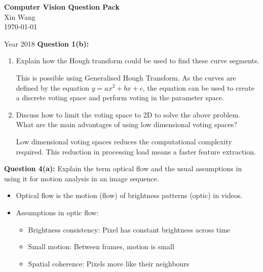 \documentclass{article}
\newcommand{\maketitletwo}[2][]{\begin{center}
        \Large{\textbf{Computer Vision #1 \\ } }
        \vspace{5pt}
        \normalsize{Xin Wang \\ 
        \today}   
        \vspace{15pt}
\end{center}}
\begin{document}
    \maketitletwo[Question Pack] 

    \section{Year 2018}
    \textbf{Question 1(b):} 
    \begin{enumerate}
        \item Explain how the Hough transform could be used to find these curve segments.

        This is possible using Generalised Hough Transform. As the curves are
        defined by the equation $y = ax^2 + bx + c$, the equation can be used to
        create a discrete voting space and perform voting in the parameter
        space. 
        
        \item  Discuss how to limit the voting space to 2D to solve the above problem. What are the main 
        advantages of using low dimensional voting spaces?

        Low dimensional voting spaces reduces the computational complexity
        required. This reduction in processing load means a faster feature
        extraction. 
    \end{enumerate}
    

    \textbf{Question 4(a):} Explain the term optical flow and the usual
    assumptions in using it for motion analysis in an image sequence.   
    \begin{itemize}
        \item Optical flow is the motion (flow) of brightness patterns (optic) in videos.
        \item Assumptions in optic flow:
        \begin{itemize}
            \item Brightness consistency: Pixel has constant brightness across
            time  
            \item Small motion: Between frames, motion is small 
            \item Spatial coherence: Pixels move like their neighbours  
        \end{itemize}
    \end{itemize}
    
\end{document}
